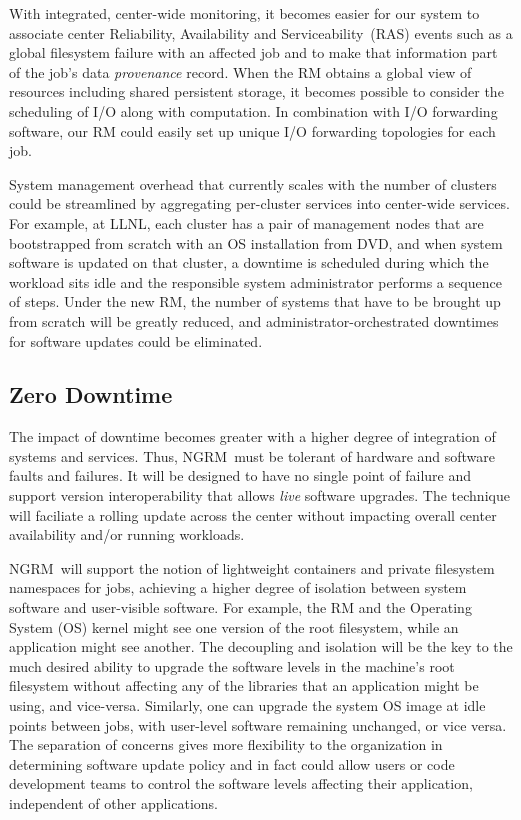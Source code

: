 \documentclass{article}
\newcommand{\ngrm}{NGRM}
\begin{document}
With integrated, center-wide monitoring, it becomes easier
for our system to associate center Reliability, Availability and Serviceability~(RAS) 
events such as a global filesystem
failure with an affected job and to make that information part of
the job's data {\em provenance} record. When the RM obtains a global view of
resources including shared persistent storage, it becomes possible to
consider the scheduling of I/O along with computation. In combination with
I/O forwarding software, our RM could easily set up unique I/O forwarding
topologies for each job.

System management overhead that currently scales with the number of clusters
could be streamlined by aggregating per-cluster services into center-wide
services. For example, at LLNL, each cluster has a pair of management
nodes that are bootstrapped from scratch with an OS installation from DVD,
and when system software is updated on that cluster, a downtime is
scheduled during which the workload sits idle and the responsible system
administrator performs a sequence of steps. Under the new RM, the
number of systems that have to be brought up from scratch will be
greatly reduced, and administrator-orchestrated downtimes for software
updates could be eliminated. 


\subsection{Zero Downtime}

The impact of downtime becomes greater with a higher degree of integration
of systems and services. Thus, \ngrm\ must be tolerant
of hardware and software faults and failures.
It will be designed to have no single point of failure and support 
version interoperability that allows {\em live} software upgrades.
The technique will faciliate a rolling update across the center 
without impacting overall center availability and/or running workloads.

\ngrm\ will support the notion of lightweight containers 
and private filesystem namespaces for jobs, achieving 
a higher degree of isolation between system software and user-visible 
software. For example, the RM and the Operating System (OS)
kernel might see one version of the root filesystem, while an application
might see another. The decoupling and isolation will be the key to the 
much desired ability to upgrade the software levels in the machine's
root filesystem without affecting any of the
libraries that an application might be using, and vice-versa. 
Similarly, one can upgrade the system OS image at idle points between jobs,
with user-level software remaining unchanged, or vice versa. The separation of
concerns gives more flexibility to the organization in determining software
update policy and in fact could allow users or code development teams to
control the software levels affecting their application, independent of
other applications.
\end{document}
